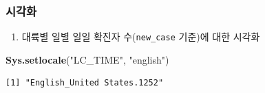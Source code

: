 \documentclass[
  11pt,
]{krantz}
\newenvironment{Shaded}{\begin{snugshade}}{\end{snugshade}}
\newcommand{\KeywordTok}[1]{\textcolor[rgb]{0.27,0.27,0.27}{\textbf{#1}}}
\newcommand{\NormalTok}[1]{#1}
\newcommand{\StringTok}[1]{\textcolor[rgb]{0.5,0.5,0.5}{#1}}
\providecommand{\tightlist}{%
  \setlength{\itemsep}{0pt}\setlength{\parskip}{0pt}}
\begin{document}
\normalsize

\hypertarget{covid-19-visualization}{%
\subsubsection*{시각화}\label{covid-19-visualization}}


\begin{enumerate}
\def\labelenumi{\arabic{enumi}.}
\tightlist
\item
  대륙별 일별 일일 확진자 수(\texttt{new\_case} 기준)에 대한 시각화
\end{enumerate}

\footnotesize

\begin{Shaded}
\begin{Highlighting}[]
\KeywordTok{Sys.setlocale}\NormalTok{(}\StringTok{"LC_TIME"}\NormalTok{, }\StringTok{"english"}\NormalTok{)}
\end{Highlighting}
\end{Shaded}

\begin{verbatim}
[1] "English_United States.1252"
\end{verbatim}
\end{document}
